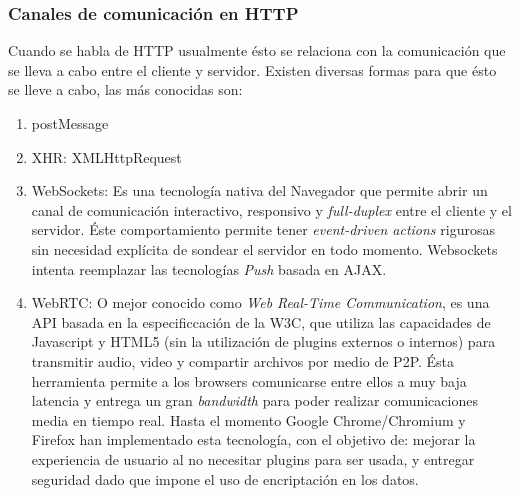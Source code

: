         \subsubsection{Canales de comunicación en HTTP}
        \label{chap2:comunHTTP}
        Cuando se habla de HTTP usualmente ésto se relaciona con la comunicación que se lleva a cabo entre el cliente y servidor. Existen diversas formas para que ésto se lleve a cabo, las más conocidas son:
        \begin{enumerate}
            \item postMessage

            \item XHR: XMLHttpRequest

            \item WebSockets: Es una tecnología nativa del Navegador que permite abrir un canal de comunicación interactivo, responsivo y \textit{full-duplex} entre el cliente y el servidor. Éste comportamiento permite tener \textit{event-driven actions} rigurosas sin necesidad explícita de sondear el servidor en todo momento. Websockets intenta reemplazar las tecnologías \textit{Push} basada en AJAX.

            \item WebRTC: O mejor conocido como \textit{Web Real-Time Communication}, es una API basada en la especificcación de la W3C, que utiliza las capacidades de Javascript y HTML5 (sin la utilización de plugins externos o internos) para transmitir audio, video y compartir archivos por medio de P2P. Ésta herramienta permite a los browsers comunicarse entre ellos a muy baja latencia y entrega un gran \textit{bandwidth} para poder realizar comunicaciones media en tiempo real. Hasta el momento Google Chrome/Chromium y Firefox han implementado esta tecnología, con el objetivo de: mejorar la experiencia de usuario al no necesitar plugins para ser usada, y entregar seguridad dado que impone el uso de encriptación en los datos.
        \end{enumerate}

